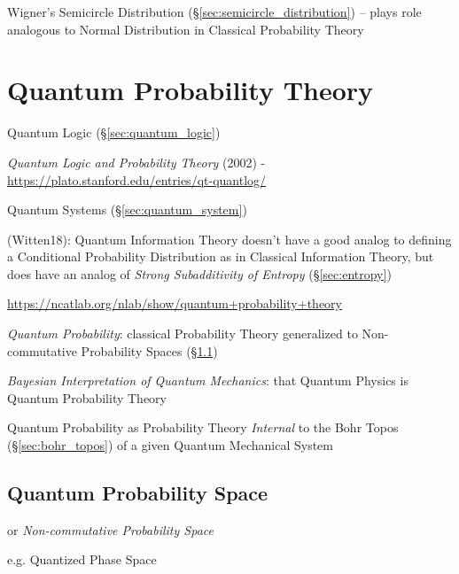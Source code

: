 Wigner's Semicircle Distribution (\S\ref{sec:semicircle_distribution}) -- plays
role analogous to Normal Distribution in Classical Probability Theory



\section{Quantum Probability Theory}\label{sec:quantum_probability}

Quantum Logic (\S\ref{sec:quantum_logic})

\emph{Quantum Logic and Probability Theory} (2002) -
\url{https://plato.stanford.edu/entries/qt-quantlog/}

Quantum Systems (\S\ref{sec:quantum_system})

(Witten18): Quantum Information Theory doesn't have a good analog to defining a
Conditional Probability Distribution as in Classical Information Theory, but
does have an analog of \emph{Strong Subadditivity of Entropy}
(\S\ref{sec:entropy})

\url{https://ncatlab.org/nlab/show/quantum+probability+theory}

\emph{Quantum Probability}: classical Probability Theory generalized to
Non-commutative Probability Spaces (\S\ref{sec:quantum_probability_space})

\emph{Bayesian Interpretation of Quantum Mechanics}: that Quantum Physics is
Quantum Probability Theory

Quantum Probability as Probability Theory \emph{Internal} to the Bohr Topos
(\S\ref{sec:bohr_topos}) of a given Quantum Mechanical System



\subsection{Quantum Probability Space}\label{sec:quantum_probability_space}

or \emph{Non-commutative Probability Space}

e.g. Quantized Phase Space
